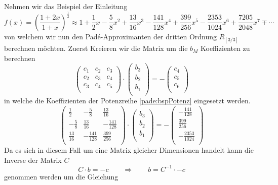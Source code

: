 Nehmen wir das Beispiel der Einleitung
\begin{equation}
f(x)
=
\left(\frac{1+2x}{1+x}\right)^{\frac{1}{2}}
\approx
1+\frac{1}{2}x - \frac{5}{8}x^2+\frac{13}{16}x^3 -\frac{141}{128}x^4 +\frac{399}{256}x^5 - \frac{2353}{1024}x^6 + \frac{7205}{2048}x^7 \mp \cdots
\label{pade:bspPotenz}
\end{equation}
von welchem wir nun den Padé-Approximanten der dritten Ordnung $R_{[3/3]}$ berechnen möchten.
Zuerst Kreieren wir die Matrix um die $b_M$ Koeffizienten zu berechnen
\[
\renewcommand\arraystretch{1.25}
\begin{pmatrix}
c_{1} & c_{2} & c_{3}\\
c_{2} & c_{3} & c_{4}\\
c_{3} & c_{4} & c_{5} \\
\end{pmatrix}
\cdot
\begin{pmatrix}
b_{3}\\
b_{2}\\
b_{1}\\
\end{pmatrix}
=
-
\begin{pmatrix}
c_{4}\\
c_{5}\\
c_{6}\\
\end{pmatrix}
\]
in welche die Koeffizienten der Potenzreihe \ref{pade:bspPotenz} eingesetzt werden.
\[
\renewcommand\arraystretch{1.25}
\begin{pmatrix}
\frac{1}{2} & -\frac{5}{8} & \frac{13}{16}\\
-\frac{5}{8} & \frac{13}{16}& -\frac{141}{128}\\
\frac{13}{16} & -\frac{141}{128} & \frac{399}{256} \\
\end{pmatrix}
\cdot
\begin{pmatrix}
b_{3}\\
b_{2}\\
b_{1}\\
\end{pmatrix}
=
-
\begin{pmatrix}
-\frac{141}{128}\\
\frac{399}{256}\\
-\frac{2353}{1024}\\
\end{pmatrix}
\]
Da es sich in diesem Fall um eine Matrix gleicher Dimensionen handelt kann die Inverse der Matrix $C$
\begin{equation}
C\cdot b = -c
\qquad\Rightarrow\qquad
b = C^{-1} \cdot -c
\end{equation}
genommen werden um die Gleichung 

